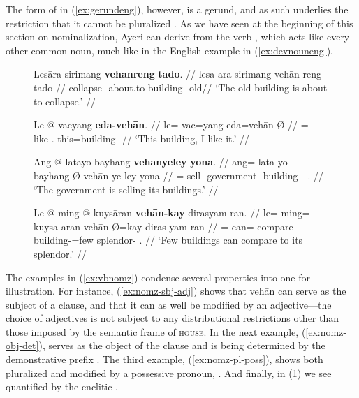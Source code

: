 The form of  in (\ref{ex:gerundeng}), however, is a gerund, and as
such underlies the restriction that it cannot be pluralized
\citep[35]{payne1997}. As we have seen at the beginning of this section on
nominalization, Ayeri can derive 
from the verb , which acts like every other common
noun, much like in the English example in (\ref{ex:devnouneng}).

\begin{figure}
\pex\label{ex:vbnomz}
\a\label{ex:nomz-sbj-adj}\begingl
	\gla Lesāra sirimang \textbf{vehānreng} \textbf{tado}. //
	\glb lesa-ara sirimang vehān-reng tado //
	\glc collapse-\TsgI{} about.to building-\AargI{} old//
	\glft `The old building is about to collapse.' //
\endgl

\a\label{ex:nomz-obj-det}\begingl
	\gla Le @ vacyang \textbf{eda-vehān}. //
	\glb le= vac=yang eda=vehān-Ø //
	\glc \PatTI{}= like-\Fsg{}.\Aarg{} this=building-\Top{} //
	\glft `This building, I like it.' //
\endgl

\a\label{ex:nomz-pl-poss}\begingl
	\gla Ang @ latayo bayhang \textbf{vehānyeley} \textbf{yona}. //
	\glb ang= lata-yo bayhang-Ø vehān-ye-ley yona //
	\glc \AgtT{}= sell-\TsgN{} government-\Top{} 
		building-\Pl{}-\PargI{} \TsgN{}.\Gen{} //
	\glft `The government is selling its buildings.' //
\endgl

\a\label{ex:nomz-qty}\begingl
	\gla Le @ ming @ kuysāran \textbf{vehān-kay} dirasyam ran. //
	\glb le= ming= kuysa-aran vehān-Ø=kay diras-yam ran //
	\glc \PatTI{}= can= compare-\TplI{} building-\Top=few 
		splendor-\Dat{} \TsgI{}.\Gen{} //
	\glft `Few buildings can compare to its splendor.' //
\endgl
\xe
\end{figure}

The examples in (\ref{ex:vbnomz}) condense several properties into one for
illustration. For instance, (\ref{ex:nomz-sbj-adj}) shows that 
{vehān} can serve as the subject of a clause, and that it can as well
be modified by an adjective---the choice of adjectives is not subject to any
distributional restrictions other than those imposed by the semantic frame of
\textsc{house}. In the next example, (\ref{ex:nomz-obj-det}),
 serves as the object of the clause and is being
determined by the demonstrative prefix . The third
example, (\ref{ex:nomz-pl-poss}), shows  both pluralized
and modified by a possessive pronoun, . And finally, in
(\ref{ex:nomz-qty}) we see  quantified by the enclitic
.

